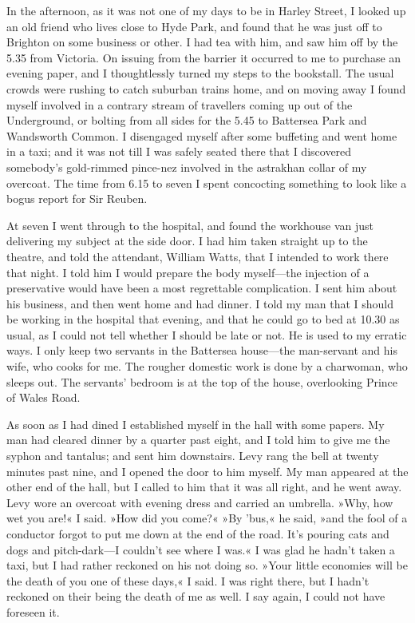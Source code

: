 In the afternoon, as it was not one of my days to be in Harley Street, I looked up an old friend who lives close to Hyde Park, and found that he was just off to Brighton on some business or other. I had tea with him, and saw him off by the 5.35 from Victoria. On issuing from the barrier it occurred to me to purchase an evening paper, and I thoughtlessly turned my steps to the bookstall. The usual crowds were rushing to catch suburban trains home, and on moving away I found myself involved in a contrary stream of travellers coming up out of the Underground, or bolting from all sides for the 5.45 to Battersea Park and Wandsworth Common. I disengaged myself after some buffeting and went home in a taxi; and it was not till I was safely seated there that I discovered somebody's gold-rimmed pince-nez involved in the astrakhan collar of my overcoat. The time from 6.15 to seven I spent concocting something to look like a bogus report for Sir Reuben.

At seven I went through to the hospital, and found the workhouse van just delivering my subject at the side door. I had him taken straight up to the theatre, and told the attendant, William Watts, that I intended to work there that night. I told him I would prepare the body myself—the injection of a preservative would have been a most regrettable complication. I sent him about his business, and then went home and had dinner. I told my man that I should be working in the hospital that evening, and that he could go to bed at 10.30 as usual, as I could not tell whether I should be late or not. He is used to my erratic ways. I only keep two servants in the Battersea house—the man-servant and his wife, who cooks for me. The rougher domestic work is done by a charwoman, who sleeps out. The servants' bedroom is at the top of the house, overlooking Prince of Wales Road.

As soon as I had dined I established myself in the hall with some papers. My man had cleared dinner by a quarter past eight, and I told him to give me the syphon and tantalus; and sent him downstairs. Levy rang the bell at twenty minutes past nine, and I opened the door to him myself. My man appeared at the other end of the hall, but I called to him that it was all right, and he went away. Levy wore an overcoat with evening dress and carried an umbrella. »Why, how wet you are!« I said. »How did you come?« »By 'bus,« he said, »and the fool of a conductor forgot to put me down at the end of the road. It's pouring cats and dogs and pitch-dark—I couldn't see where I was.« I was glad he hadn't taken a taxi, but I had rather reckoned on his not doing so. »Your little economies will be the death of you one of these days,« I said. I was right there, but I hadn't reckoned on their being the death of me as well. I say again, I could not have foreseen it.

